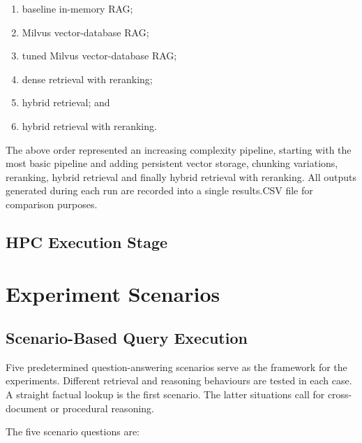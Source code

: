 \begin{enumerate}
    \item baseline in-memory \ac{RAG};
    \item Milvus vector-database \ac{RAG};
    \item tuned Milvus vector-database \ac{RAG};
    \item dense retrieval with reranking;
    \item hybrid retrieval; and
    \item hybrid retrieval with reranking.
\end{enumerate}

The above order represented an increasing complexity pipeline, starting with the most basic pipeline and adding persistent vector storage, chunking variations, reranking, hybrid retrieval and finally hybrid retrieval with reranking. All outputs generated during each run are recorded into a single results.CSV file for comparison purposes.

\subsection{HPC Execution Stage}

\section{Experiment Scenarios}

\subsection{Scenario-Based Query Execution}
Five predetermined question-answering scenarios serve as the framework for the experiments. Different retrieval and reasoning behaviours are tested in each case. A straight factual lookup is the first scenario. The latter situations call for cross-document or procedural reasoning.

The five scenario questions are:

